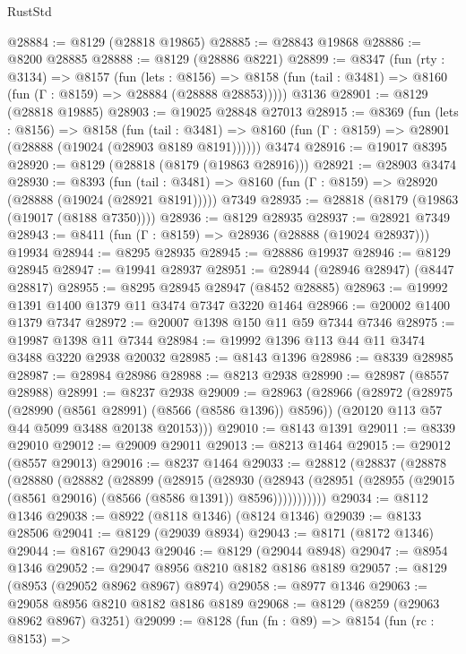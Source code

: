 \begin{lexlean}{RustStd}
\begin{coremodule}
@28884 := @8129 (@28818 @19865)
@28885 := @28843 @19868
@28886 := @8200 @28885
@28888 := @8129 (@28886 @8221)
@28899 := @8347
    (fun (rty : @3134) =>
    @8157
      (fun (lets : @8156) =>
      @8158 (fun (tail : @3481) => @8160 (fun (Γ : @8159) => @28884 (@28888 @28853)))))
    @3136
@28901 := @8129 (@28818 @19885)
@28903 := @19025 @28848 @27013
@28915 := @8369
    (fun (lets : @8156) =>
    @8158
      (fun (tail : @3481) =>
      @8160 (fun (Γ : @8159) => @28901 (@28888 (@19024 (@28903 @8189 @8191))))))
    @3474
@28916 := @19017 @8395
@28920 := @8129 (@28818 (@8179 (@19863 @28916)))
@28921 := @28903 @3474
@28930 := @8393
    (fun (tail : @3481) => @8160 (fun (Γ : @8159) => @28920 (@28888 (@19024 (@28921 @8191)))))
    @7349
@28935 := @28818 (@8179 (@19863 (@19017 (@8188 @7350))))
@28936 := @8129 @28935
@28937 := @28921 @7349
@28943 := @8411 (fun (Γ : @8159) => @28936 (@28888 (@19024 @28937))) @19934
@28944 := @8295 @28935
@28945 := @28886 @19937
@28946 := @8129 @28945
@28947 := @19941 @28937
@28951 := @28944 (@28946 @28947) (@8447 @28817)
@28955 := @8295 @28945 @28947 (@8452 @28885)
@28963 := @19992 @1391 @1400 @1379 @11 @3474 @7347 @3220 @1464
@28966 := @20002 @1400 @1379 @7347
@28972 := @20007 @1398 @150 @11 @59 @7344 @7346
@28975 := @19987 @1398 @11 @7344
@28984 := @19992 @1396 @113 @44 @11 @3474 @3488 @3220 @2938 @20032
@28985 := @8143 @1396
@28986 := @8339 @28985
@28987 := @28984 @28986
@28988 := @8213 @2938
@28990 := @28987 (@8557 @28988)
@28991 := @8237 @2938
@29009 := @28963
    (@28966
      (@28972
        (@28975 (@28990 (@8561 @28991) (@8566 (@8586 @1396)) @8596))
        (@20120 @113 @57 @44 @5099 @3488 @20138 @20153)))
@29010 := @8143 @1391
@29011 := @8339 @29010
@29012 := @29009 @29011
@29013 := @8213 @1464
@29015 := @29012 (@8557 @29013)
@29016 := @8237 @1464
@29033 := @28812
    (@28837
      (@28878
        (@28880
          (@28882
            (@28899
              (@28915
                (@28930
                  (@28943
                    (@28951 (@28955 (@29015 (@8561 @29016) (@8566 (@8586 @1391)) @8596)))))))))))
@29034 := @8112 @1346
@29038 := @8922 (@8118 @1346) (@8124 @1346)
@29039 := @8133 @28506
@29041 := @8129 (@29039 @8934)
@29043 := @8171 (@8172 @1346)
@29044 := @8167 @29043
@29046 := @8129 (@29044 @8948)
@29047 := @8954 @1346
@29052 := @29047 @8956 @8210 @8182 @8186 @8189
@29057 := @8129 (@8953 (@29052 @8962 @8967) @8974)
@29058 := @8977 @1346
@29063 := @29058 @8956 @8210 @8182 @8186 @8189
@29068 := @8129 (@8259 (@29063 @8962 @8967) @3251)
@29099 := @8128
    (fun (fn : @89) =>
    @8154
      (fun (rc : @8153) =>

\end{coremodule}
\end{lexlean}
